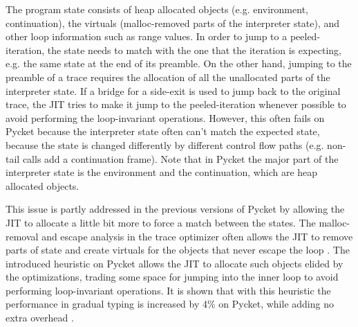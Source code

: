 The program state consists of heap allocated objects
(e.g. environment, continuation), the virtuals (malloc-removed parts
of the interpreter state), and other loop information such as range
values. In order to jump to a peeled-iteration, the state needs to
match with the one that the iteration is expecting, e.g. the same
state at the end of its preamble. On the other hand, jumping to the
preamble of a trace requires the allocation of all the unallocated
parts of the interpreter state. If a bridge for a side-exit is used to
jump back to the original trace, the JIT tries to make it jump to the
peeled-iteration whenever possible to avoid performing the
loop-invariant operations. However, this often fails on Pycket because
the interpreter state often can't match the expected state, because
the state is changed differently by different control flow paths
(e.g. non-tail calls add a continuation frame). Note that in Pycket
the major part of the interpreter state is the environment and the
continuation, which are heap allocated objects.

This issue is partly addressed in the previous versions of Pycket by
allowing the JIT to allocate a little bit more to force a match
between the states. The malloc-removal and escape analysis in the
trace optimizer often allows the JIT to remove parts of state and
create virtuals for the objects that never escape the loop
\cite{malloc-removal:11, loop-aware:12}. The introduced heuristic on
Pycket allows the JIT to allocate such objects elided by the
optimizations, trading some space for jumping into the inner loop to
avoid performing loop-invariant operations. It is shown that with this
heuristic the performance in gradual typing is increased by 4\% on
Pycket, while adding no extra overhead \cite{pycket17}.

